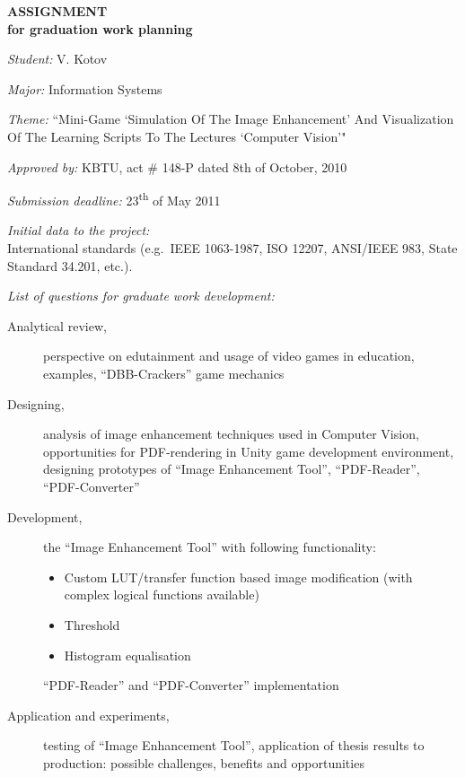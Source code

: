 \begin{titlepage}
\begin{center}
		{\bf
		\MakeUppercase{Assignment}\\
		for graduation work planning}

		\vspace{12pt}

	\end{center}

	\setlength{\parindent}{0pt}
	\setlength{\parskip}{1ex plus 0.5ex minus 0.2ex}

	\emph{Student:} V. Kotov

	\emph{Major:} Information Systems

	\emph{Theme:} ``Mini-Game `Simulation Of The Image Enhancement' And Visualization Of The Learning Scripts To The Lectures `Computer Vision'"

	\emph{Approved by:} KBTU, act \# 148-P dated 8th of October, 2010

	\emph{Submission deadline:} 23\textsuperscript{th} of May 2011

	\emph{Initial data to the project:}\\
	International standards (e.g.\ IEEE 1063-1987, ISO 12207, ANSI/IEEE 983, State Standard 34.201, etc.).

	\emph{List of questions for graduate work development:}
	\begin{description}
		\item[Analytical review,]
		perspective on edutainment and usage of video games in education, examples, ``DBB-Crackers'' game mechanics
		\item[Designing,]
		analysis of image enhancement techniques used in Computer Vision, opportunities for PDF-rendering in Unity game development environment, designing prototypes of ``Image Enhancement Tool'', ``PDF-Reader'', ``PDF-Converter''
		\item[Development,]
		the ``Image Enhancement Tool'' with following functionality:
		\begin{itemize}
			\item Custom LUT/transfer function based image modification (with complex logical functions available)
			\item Threshold 
			\item Histogram equalisation
		\end{itemize}
		``PDF-Reader'' and ``PDF-Converter'' implementation
		\item[Application and experiments,]
		testing of ``Image Enhancement Tool'', application of thesis results to production: possible challenges, benefits and opportunities
	\end{description}


\end{titlepage}
